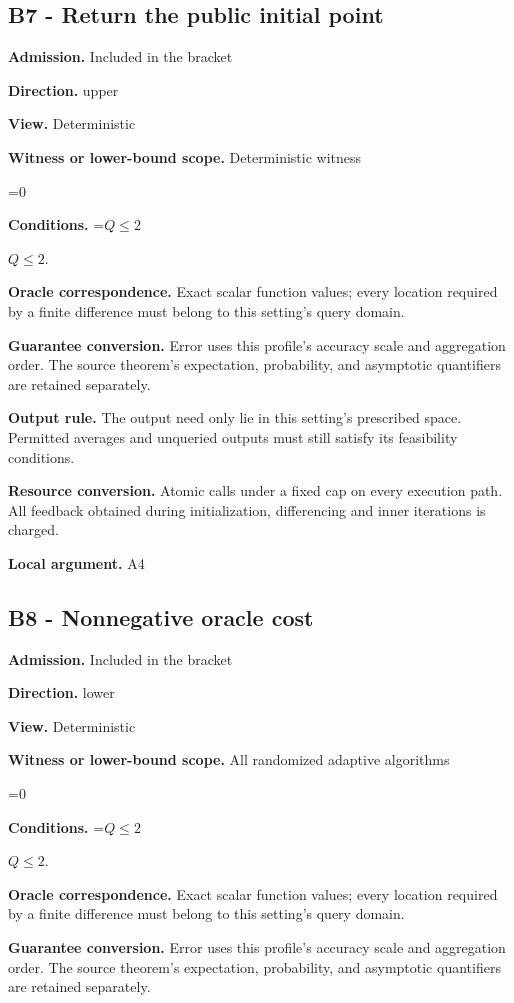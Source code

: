 \documentclass[10pt,a4paper]{article}
\newcommand{\AtlasMath}[1]{\par\begingroup\centering\setbox0=\hbox{$\displaystyle #1$}\ifdim\wd0>1.4\linewidth\typeout{ATLAS WIDE FORMULA: \the\wd0}\fi\ifdim\wd0>\linewidth\resizebox{\linewidth}{!}{\box0}\else\box0\fi\par\endgroup}
\newcommand{\AtlasInlineMath}[1]{\begingroup\setbox0=\hbox{$#1$}\ifdim\wd0>.4\linewidth\endgroup\AtlasMath{#1}\else\endgroup$#1$\fi}
\begin{document}
\subsection{B7 - Return the public initial point}
\textbf{Admission.} Included in the bracket

\textbf{Direction.} upper

\textbf{View.} Deterministic

\textbf{Witness or lower-bound scope.} Deterministic witness

\AtlasMath{0}
\textbf{Conditions.} \AtlasInlineMath{Q\le2}.

\textbf{Oracle correspondence.} Exact scalar function values; every location required by a finite difference must belong to this setting's query domain.

\textbf{Guarantee conversion.} Error uses this profile's accuracy scale and aggregation order. The source theorem's expectation, probability, and asymptotic quantifiers are retained separately.

\textbf{Output rule.} The output need only lie in this setting's prescribed space. Permitted averages and unqueried outputs must still satisfy its feasibility conditions.

\textbf{Resource conversion.} Atomic calls under a fixed cap on every execution path. All feedback obtained during initialization, differencing and inner iterations is charged.

\textbf{Local argument.} A4

\subsection{B8 - Nonnegative oracle cost}
\textbf{Admission.} Included in the bracket

\textbf{Direction.} lower

\textbf{View.} Deterministic

\textbf{Witness or lower-bound scope.} All randomized adaptive algorithms

\AtlasMath{0}
\textbf{Conditions.} \AtlasInlineMath{Q\le2}.

\textbf{Oracle correspondence.} Exact scalar function values; every location required by a finite difference must belong to this setting's query domain.

\textbf{Guarantee conversion.} Error uses this profile's accuracy scale and aggregation order. The source theorem's expectation, probability, and asymptotic quantifiers are retained separately.
\end{document}

